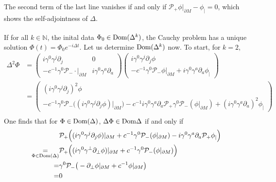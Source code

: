 The second term of the last line vanishes if and only if $\mathcal{P}_+\phi \vert_{\partial M} - \phi_|= 0$, which shows the self-adjointness of $\Delta$. \\\\
If for all $k\in\mathbb{N}$, the inital data $\Phi_0\in\mathrm{Dom}(\Delta^k)$, the Cauchy problem has a unique solution $\Phi(t) = \Phi_0 e^{-i\Delta t}$.
Let us determine $\mathrm{Dom} (\Delta^k)$ now. 
To start, for $k =2$, 
\begin{equation}\label{wen-deltak}
\begin{split}
\Delta^2 \Phi & =  
\begin{pmatrix} i \gamma^0 \gamma^j \partial_j & 0 \\
- c^{-1} \gamma^0 \mathcal{P}_- \cdot \vert_{\partial M} & i \gamma^0 \gamma^a \partial_a \end{pmatrix}
\begin{pmatrix}   i \gamma^0 \gamma^j \partial_j \phi \\
- c^{-1} \gamma^0 \mathcal{P}_- \phi\vert_{\partial M} + i \gamma^0 \gamma^a \partial_a  \phi_| \end{pmatrix} \\
&= 
\begin{pmatrix} (i\gamma^0\gamma^j\partial_j)^2 \phi \\
-c^{-1}\gamma^0\mathcal{P}_- \big( (i\gamma^0\gamma^j\partial_j \phi)\vert_{\partial M}\big)
-c^{-1}i \gamma^0\gamma^a\partial_a \mathcal{P}_+ \gamma^0 \mathcal{P}_-(\phi\vert_{\partial M})
+ (i\gamma^0\gamma^a\partial_a)^2\phi_| \end{pmatrix}
\\
\end{split}
\end{equation}
One finds that for $\Phi \in \mathrm{Dom}(\Delta)$, $\Delta \Phi \in \mathrm{Dom} \Delta$ if and only if
\begin{equation*}
\begin{split}
&\mathcal{P}_+\Big( ( i\gamma^0\gamma^j \partial_j \phi ) \vert_{\partial M} +
 c^{-1}\gamma^0 \mathcal{P}_- ( \phi \vert_{\partial M})
- i \gamma^0 \gamma^a \partial_a \mathcal{P}_+\phi _| \Big) \\
\underset{\Phi\in \mathrm{Dom}(\Delta)}{ = }& 
\mathcal{P}_+\Big( (i\gamma^0\gamma^\bot \partial_\bot\phi)\vert_{\partial M} +
c^{-1}\gamma^0 \mathcal{P}_- ( \phi \vert_{\partial M}) \Big) \\ 
= & 
\gamma^0\mathcal{P}_-\big(- \partial_\bot \phi \vert_{\partial M} + c^{-1} \phi\vert_{\partial M}\big)
\\ = & 0
\end{split}
\end{equation*}
